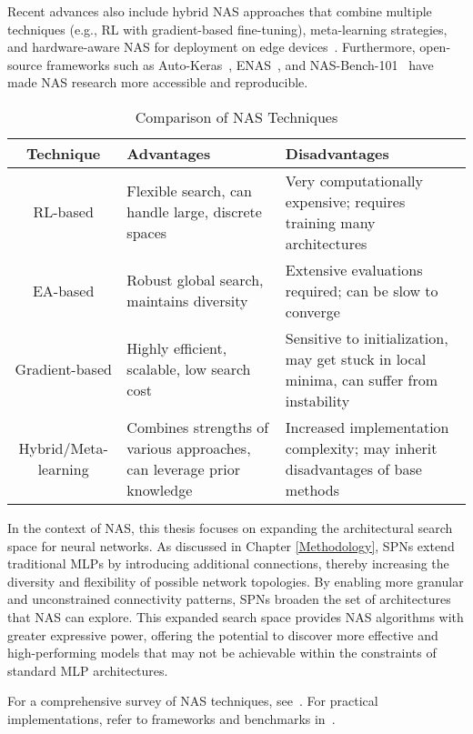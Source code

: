 Recent advances also include hybrid NAS approaches that combine multiple techniques (e.g., RL with gradient-based fine-tuning), meta-learning strategies, and hardware-aware NAS for deployment on edge devices~\cite{elsken2019neural,wistuba2019survey,tan2019mnasnet}. Furthermore, open-source frameworks such as Auto-Keras~\cite{jin2019auto}, ENAS~\cite{pham2018efficient}, and NAS-Bench-101~\cite{ying2019bench} have made NAS research more accessible and reproducible.

\begin{table}[ht]
\centering
\caption{Comparison of NAS Techniques}
\begin{tabular}{|c|m{4cm}|m{4cm}|}
\hline
\textbf{Technique} & \textbf{Advantages} & \textbf{Disadvantages} \\
\hline
RL-based & Flexible search, can handle large, discrete spaces & Very computationally expensive; requires training many architectures \\
\hline
EA-based & Robust global search, maintains diversity & Extensive evaluations required; can be slow to converge \\
\hline
Gradient-based & Highly efficient, scalable, low search cost & Sensitive to initialization, may get stuck in local minima, can suffer from instability \\
\hline
Hybrid/Meta-learning & Combines strengths of various approaches, can leverage prior knowledge & Increased implementation complexity; may inherit disadvantages of base methods \\
\hline
\end{tabular}
\label{tab:nas_techniques}
\end{table}

In the context of NAS, this thesis focuses on expanding the architectural search space for neural networks. As discussed in Chapter \ref{Methodology}, SPNs extend traditional MLPs by introducing additional connections, thereby increasing the diversity and flexibility of possible network topologies. By enabling more granular and unconstrained connectivity patterns, SPNs broaden the set of architectures that NAS can explore. This expanded search space provides NAS algorithms with greater expressive power, offering the potential to discover more effective and high-performing models that may not be achievable within the constraints of standard MLP architectures.

For a comprehensive survey of NAS techniques, see~\cite{elsken2019neural,wistuba2019survey}. For practical implementations, refer to frameworks and benchmarks in~\cite{jin2019auto,pham2018efficient,ying2019bench}.


